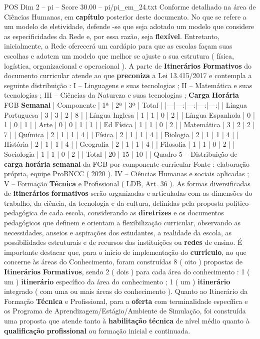 \begin{textsample}{POS Dim 2 – pi – Score 30.00 – pi/pi\_em\_24.txt}
Conforme detalhado na área de Ciências Humanas, em \textbf{capítulo} posterior deste documento.
No que se refere a um modelo de eletividade, defende -se que seja adotado um modelo que considere as especificidades da Rede e, por essa razão, seja \textbf{flexível}.
Entretanto, inicialmente, a Rede oferecerá um cardápio para que as escolas façam suas escolhas e adotem um modelo que melhor se ajuste a sua estrutura ( física, logística, organizacional e operacional ).
A parte de \textbf{Itinerários} \textbf{Formativos} do documento curricular atende ao que \textbf{preconiza} a Lei 13.415/2017 e contempla a seguinte distribuição : I – Linguagens e suas tecnologias ; II – Matemática e suas tecnologias ; III – Ciências da Natureza e suas tecnologias ; \textbf{Carga} \textbf{Horária} FGB \textbf{Semanal} | Componente | 1ª | 2ª | 3ª | Total | |---|---:|---:|---:|---:| | Língua Portuguesa | 3 | 3 | 2 | 8 | | Língua Inglesa | 1 | 1 | 0 | 2 | | Língua Espanhola | 0 | 1 | 0 | 1 | | Arte | 0 | 0 | 1 | 1 | | Ed Física | 1 | 1 | 0 | 2 | | Matemática | 3 | 2 | 2 | 7 | | Química | 2 | 1 | 1 | 4 | | Física | 2 | 1 | 1 | 4 | | Biologia | 2 | 1 | 1 | 4 | | História | 2 | 1 | 1 | 4 | | Geografia | 2 | 1 | 1 | 4 | | Filosofia | 1 | 1 | 0 | 2 | | Sociologia | 1 | 1 | 0 | 2 | | Total | 20 | 15 | 10 | | Quadro 5 – Distribuição de \textbf{carga} \textbf{horária} \textbf{semanal} da FGB por componente curricular Fonte : elaboração própria, equipe ProBNCC ( 2020 ).
IV – Ciências Humanas e sociais aplicadas ; V – Formação \textbf{Técnica} e Profissional ( LDB, Art. 36 ).
As formas diversificadas de \textbf{itinerários} \textbf{formativos} serão organizadas e articuladas com as dimensões do trabalho, da ciência, da tecnologia e da cultura, definidas pela proposta político-pedagógica de cada escola, considerando as \textbf{diretrizes} e os documentos pedagógicos que definem e orientam a flexibilização curricular, observando as necessidades, anseios e aspirações dos estudantes, a realidade da escola, as possibilidades estruturais e de recursos das instituições ou \textbf{redes} de ensino.
É importante destacar que, para o início de implementação do \textbf{currículo}, no que concerne às áreas do Conhecimento, foram construídas 8 ( oito ) propostas de \textbf{Itinerários} \textbf{Formativos}, sendo 2 ( dois ) para cada área do conhecimento : 1 ( um ) \textbf{itinerário} específico da área do conhecimento ; 1 ( um ) \textbf{itinerário} integrado ( com uma ou mais áreas do conhecimento ).
Quanto ao Itinerário da Formação \textbf{Técnica} e Profissional, para a \textbf{oferta} com terminalidade específica e os Programa de Aprendizagem/Estágio/Ambiente de Simulação, foi construída uma proposta que atende tanto à \textbf{habilitação} \textbf{técnica} de nível médio quanto à \textbf{qualificação} \textbf{profissional} ou formação inicial e continuada.

\end{textsample}
